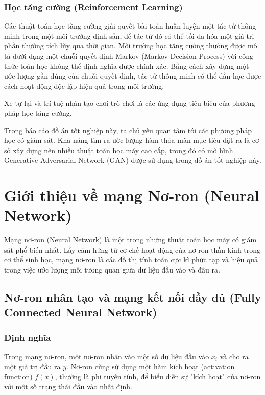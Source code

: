 \documentclass[12pt]{extreport}
\begin{document}
\subsubsection{Học tăng cường (Reinforcement Learning)}

Các thuật toán học tăng cường giải quyết bài toán huấn luyện một tác tử thông minh trong một môi trường định sẵn, để tác tử đó có thể tối đa hóa một giá trị phần thưởng tích lũy qua thời gian. Môi trường học tăng cường thường được mô tả dưới dạng một chuỗi quyết định Markov (Markov Decision Process) với công thức toán học không thể định nghĩa được chính xác. Bằng cách xây dựng một ước lượng gần đúng của chuỗi quyết định, tác tử thông minh có thể dần học được cách hoạt động độc lập hiệu quả trong môi trường.

Xe tự lại và trí tuệ nhân tạo chơi trò chơi là các ứng dụng tiêu biểu của phương pháp học tăng cường.

Trong báo cáo đồ án tốt nghiệp này, ta chủ yếu quan tâm tới các phương pháp học có giám sát. Khả năng tìm ra ước lượng hàm thỏa mãn mục tiêu đặt ra là cơ sở xây dựng nên nhiều thuật toán học máy cao cấp, trong đó có mô hình Generative Adversarial Network (GAN) được sử dụng trong đồ án tốt nghiệp này.

\section{Giới thiệu về mạng Nơ-ron (Neural Network)}

Mạng nơ-ron (Neural Network) là một trong những thuật toán học máy có giám sát phổ biến nhất. Lấy cảm hứng từ cơ chế hoạt động của nơ-ron thần kinh trong cơ thể sinh học, mạng nơ-ron là các đồ thị tính toán cực kì phức tạp và hiệu quả trong việc ước lượng mối tương quan giữa dữ liệu đầu vào và đầu ra.

\subsection{Nơ-ron nhân tạo và mạng kết nối đầy đủ (Fully Connected Neural Network)}

\subsubsection{Định nghĩa}

Trong mạng nơ-ron, một nơ-ron nhận vào một số dữ liệu đầu vào $ x_i $ và cho ra một giá trị đầu ra $ y $. Nơ-ron cũng sử dụng một hàm kích hoạt (activation function) $ f(x) $, thường là phi tuyến tính, để biểu diễn sự "kích hoạt" của nơ-ron với một số trạng thái đầu vào nhất định.
\end{document}

